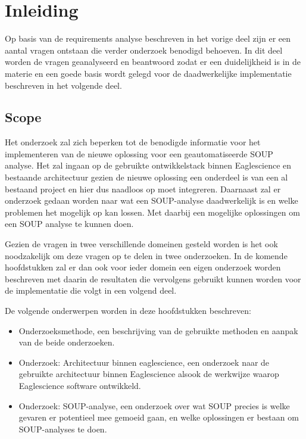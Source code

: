 
\chapter{Inleiding}\label{ch:inleiding3} %

\label{inOnderzoek} %
Op basis van de requirements analyse beschreven in het vorige deel zijn er een aantal vragen ontstaan die verder onderzoek benodigd behoeven.
In dit deel worden de vragen geanalyseerd en beantwoord zodat er een duidelijkheid is in de materie en een goede basis wordt gelegd voor de daadwerkelijke implementatie beschreven in het volgende deel.

\section{Scope}\label{sec:scope}
Het onderzoek zal zich beperken tot de benodigde informatie voor het implementeren van de nieuwe oplossing voor een geautomatiseerde SOUP analyse.
Het zal ingaan op de gebruikte ontwikkelstack binnen Eaglescience en bestaande architectuur gezien de nieuwe oplossing een onderdeel is van een al bestaand project en hier dus naadloos op moet integreren.
Daarnaast zal er onderzoek gedaan worden naar wat een SOUP-analyse daadwerkelijk is en welke problemen het mogelijk op kan lossen.
Met daarbij een mogelijke oplossingen om een SOUP analyse te kunnen doen.

Gezien de vragen in twee verschillende domeinen gesteld worden is het ook noodzakelijk om deze vragen op te delen in twee onderzoeken.
In de komende hoofdstukken zal er dan ook voor ieder domein een eigen onderzoek worden beschreven met daarin de resultaten die vervolgens gebruikt kunnen worden voor de implementatie die volgt in een volgend deel.

De volgende onderwerpen worden in deze hoofdstukken beschreven:
\begin{itemize}
    \item Onderzoeksmethode, een beschrijving van de gebruikte methoden en aanpak van de beide onderzoeken.
    \item Onderzoek: Architectuur binnen eaglescience, een onderzoek naar de gebruikte architectuur binnen Eaglescience alsook de werkwijze waarop Eaglescience software ontwikkeld.
    \item Onderzoek: SOUP-analyse, een onderzoek over wat SOUP precies is welke gevaren er potentieel mee gemoeid gaan, en welke oplossingen er bestaan om SOUP-analyses te doen.
\end{itemize}
